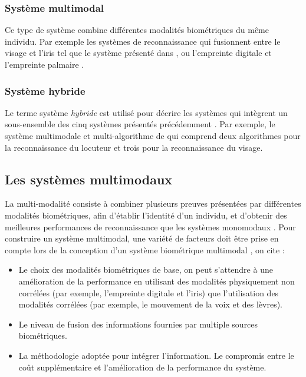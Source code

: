 \subsubsection{Système multimodal}
Ce type de système combine différentes modalités biométriques du même individu. Par exemple les systèmes de reconnaissance qui fusionnent entre le visage et l'iris tel que le système présenté dans \citep{rattani2009robust}, ou l'empreinte digitale et l'empreinte palmaire \citep{chin2009integrating}.
\subsubsection{Système hybride}
Le terme système \textit{hybride} est utilisé pour décrire les systèmes qui intègrent un sous-ensemble des cinq systèmes présentés précédemment \citep{chang2005evaluation}. Par exemple, le système multimodale et multi-algorithme de \citep{brunelli1995person} qui comprend deux algorithmes pour la reconnaissance du locuteur et trois pour la reconnaissance du visage.

\subsection{Les systèmes multimodaux}
La multi-modalité consiste à combiner plusieurs preuves présentées par différentes modalités
biométriques, afin d’établir l’identité d’un individu, et d’obtenir des meilleures performances de
reconnaissance que les systèmes monomodaux \citep{ross2003information}.
Pour construire un système multimodal, une variété de facteurs doit être prise en compte lors de la conception d'un système biométrique multimodal \citep{Ross2004a}, on cite :
\begin{itemize}
	\item Le choix des modalités biométriques de base, on peut s'attendre à une amélioration de la performance en utilisant des modalités physiquement non corrélées (par exemple, l'empreinte digitale et l'iris) que l'utilisation des modalités corrélées (par exemple, le mouvement de la voix et des lèvres).
	\item Le niveau de fusion des informations fournies par multiple sources biométriques.
	\item La méthodologie adoptée pour intégrer l’information.
	Le compromis entre le coût supplémentaire et l’amélioration de la performance du système.
\end{itemize}
